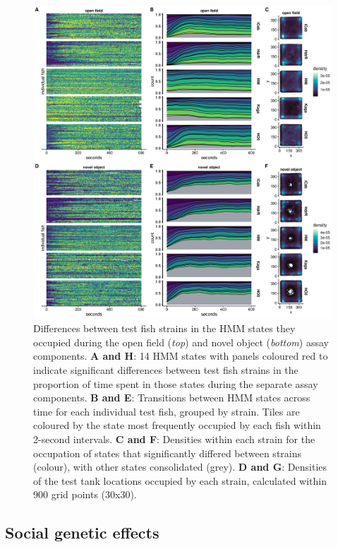 \documentclass[
]{book}
\begin{document}
\begin{figure}
\includegraphics[width=1\linewidth]{figs/pilot/0.08_14_dge} \caption{Differences between test fish strains in the HMM states they occupied during the open field (\emph{top}) and novel object (\emph{bottom}) assay components. \textbf{A and H}: 14 HMM states with panels coloured red to indicate significant differences between test fish strains in the proportion of time spent in those states during the separate assay components. \textbf{B and E}: Transitions between HMM states across time for each individual test fish, grouped by strain. Tiles are coloured by the state most frequently occupied by each fish within 2-second intervals. \textbf{C and F}: Densities within each strain for the occupation of states that significantly differed between strains (colour), with other states consolidated (grey). \textbf{D and G}: Densities of the test tank locations occupied by each strain, calculated within 900 grid points (30x30).}\label{fig:pilot-dge-time}
\end{figure}

\clearpage

\hypertarget{pilot-sge}{%
\subsection{Social genetic effects}\label{pilot-sge}}
\end{document}
